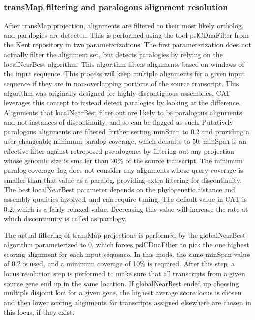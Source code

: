 \documentclass[fleqn,10pt]{wlscirep}
\begin{document}
\subsubsection{transMap filtering and paralogous alignment resolution}
	After transMap projection, alignments are filtered to their most likely ortholog, and paralogies are detected. This is performed using the tool pslCDnaFilter from the Kent repository in two parameterizations. The first parameterization does not actually filter the alignment set, but detects paralogies by relying on the localNearBest algorithm. This algorithm filters alignments based on windows of the input sequence. This process will keep multiple alignments for a given input sequence if they are in non-overlapping portions of the source transcript. This algorithm was originally designed for highly discontiguous assemblies. CAT leverages this concept to instead detect paralogies by looking at the difference. Alignments that localNearBest filter out are likely to be paralogous alignments and not instances of discontinuity, and so can be flagged as such. Putatively paralogous alignments are filtered further setting minSpan to 0.2 and providing a user-changeable minimum paralog coverage, which defaults to 50. minSpan is an effective filter against retroposed pseudogenes by filtering out any projection whose genomic size is smaller than 20\% of the source transcript. The minimum paralog coverage flag does not consider any alignments whose query coverage is smaller than that value as a paralog, providing extra filtering for discontinuity. The best localNearBest parameter depends on the phylogenetic distance and assembly qualities involved, and can require tuning. The default value in CAT is 0.2, which is a fairly relaxed value. Decreasing this value will increase the rate at which discontinuity is called as paralogy.
    
	The actual filtering of transMap projections is performed by the globalNearBest algorithm parameterized to 0, which forces pslCDnaFilter to pick the one highest scoring alignment for each input sequence. In this mode, the same minSpan value of 0.2 is used, and a minimum coverage of 10\% is required. After this step, a locus resolution step is performed to make sure that all transcripts from a given source gene end up in the same location. If globalNearBest ended up choosing multiple disjoint loci for a given gene, the highest average score locus is chosen and then lower scoring alignments for transcripts assigned elsewhere are chosen in this locus, if they exist.
\end{document}
